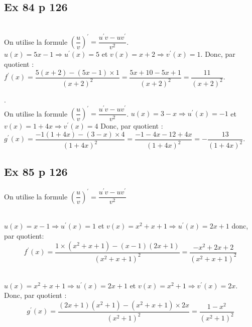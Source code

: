 \documentclass[12pt,a4paper]{book}
\begin{document}
\subsection*{Ex 84 p 126}
\begin{enumMet}
    \item {}\\
    On utilise la formule $\left(\dfrac{u}{v}\right)^{\prime}=\dfrac{u^{\prime} v-u v^{\prime}}{v^{2}}$.\\
    $u(x)=5 x-1 \Rightarrow u^{\prime}(x)=5$ et $v(x)=x+2 \Rightarrow v^{\prime}(x)=1$.
    Donc, par quotient :\\
    $f^{\prime}(x)=\dfrac{5(x+2)-(5 x-1) \times 1}{(x+2)^{2}}=\dfrac{5 x+10-5 x+1}{(x+2)^{2}}=\dfrac{11}{(x+2)^{2}}$.
    \item {}.\\
    On utilise la formule $\left(\dfrac{u}{v}\right)^{\prime}=\dfrac{u^{\prime} v-u v^{\prime}}{v^{2}}$.
    $u(x)=3-x \Rightarrow u^{\prime}(x)=-1$ et $v(x)=1+4 x \Rightarrow v^{\prime}(x)=4$
    Donc, par quotient :\\ 
    $g^{\prime}(x)=\dfrac{-1(1+4 x)-(3-x) \times 4}{(1+4 x)^{2}}=\dfrac{-1-4 x-12+4 x}{(1+4 x)^{2}}=-\dfrac{13}{(1+4 x)^{2}}$.
\end{enumMet}

\subsection*{Ex 85 p 126}
On utilise la formule $\left(\dfrac{u}{v}\right)^{\prime}=\dfrac{u^{\prime} v-u v^{\prime}}{v^{2}}$
\begin{enumMet}
    \item {}\\
    $u(x)=x-1 \Rightarrow u^{\prime}(x)=1$ et $v(x)=x^{2}+x+1 \Rightarrow u^{\prime}(x)=2 x+1$
donc, par quotient:\\
$$f^{\prime}(x)=\dfrac{1 \times\left(x^{2}+x+1\right)-(x-1)(2 x+1)}{\left(x^{2}+x+1\right)^{2}}=\dfrac{-x^{2}+2 x+2}{\left(x^{2}+x+1\right)^{2}}$$
    \item {}\\
    $u(x)=x^{2}+x+1 \Rightarrow u^{\prime}(x)=2 x+1$ et $v(x)=x^{2}+1 \Rightarrow v^{\prime}(x)=2 x$. Donc, par quotient :\\
$$g^{\prime}(x)=\dfrac{(2 x+1)\left(x^{2}+1\right)-\left(x^{2}+x+1\right) \times 2x}{\left(x^{2}+1\right)^{2}}=\dfrac{1-x^{2}}{\left(x^{2}+1\right)^{2}}$$
\end{enumMet}
\end{document}
